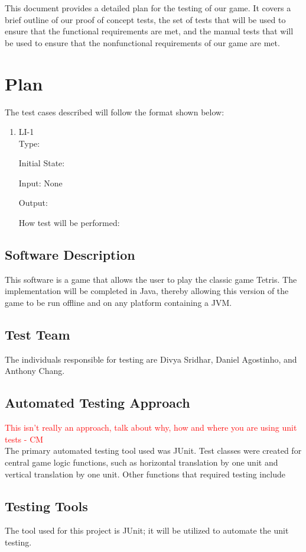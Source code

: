 \documentclass[12pt, titlepage]{article}
\begin{document}
This document provides a detailed plan for the testing of our game. It covers a brief outline of our proof of concept tests, the set of tests that will be used to ensure that the functional requirements are met, and the manual tests that will be used to ensure that the nonfunctional requirements of our game are met.
\section{Plan}
The test cases described will follow the format shown below:
\begin{enumerate}
\item{LI-1\\}
Type:
					
Initial State:
					
Input: None
					
Output:
					
How test will be performed: 
\end{enumerate}


\subsection{Software Description}
This software is a game that allows the user to play the classic game Tetris. The implementation will be completed in Java, thereby allowing this version of the game to be run offline and on any platform containing a JVM.
\subsection{Test Team}
The individuals responsible for testing are Divya Sridhar, Daniel Agostinho, and Anthony Chang.
\subsection{Automated Testing Approach}
\textcolor{red}{This isn't really an approach, talk about why, how and where you are using unit tests - CM} \\
The primary automated testing tool used was JUnit. Test classes were created for central game logic functions, such as horizontal translation by one unit and vertical translation by one unit. Other functions that required testing include 
\subsection{Testing Tools}
The tool used for this project is JUnit; it will be utilized to automate the unit testing.
\end{document}
